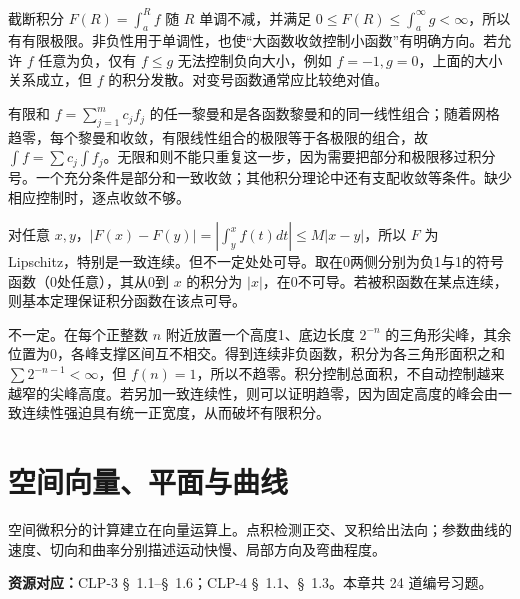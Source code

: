 \documentclass[12pt,fontset=fandol]{ctexart}
\begin{document}
\begin{solve}\label{ans:c30q17}
截断积分 $F(R)=\int_a^Rf$ 随 $R$ 单调不减，并满足 $0\le F(R)\le\int_a^\infty g<\infty$，所以有有限极限。非负性用于单调性，也使“大函数收敛控制小函数”有明确方向。若允许 $f$ 任意为负，仅有 $f\le g$ 无法控制负向大小，例如 $f=-1,g=0$，上面的大小关系成立，但 $f$ 的积分发散。对变号函数通常应比较绝对值。
\end{solve}

\begin{solve}\label{ans:c30q18}
有限和 $f=\sum_{j=1}^mc_jf_j$ 的任一黎曼和是各函数黎曼和的同一线性组合；随着网格趋零，每个黎曼和收敛，有限线性组合的极限等于各极限的组合，故 $\int f=\sum c_j\int f_j$。无限和则不能只重复这一步，因为需要把部分和极限移过积分号。一个充分条件是部分和一致收敛；其他积分理论中还有支配收敛等条件。缺少相应控制时，逐点收敛不够。
\end{solve}

\begin{solve}\label{ans:c30q19}
对任意 $x,y$，$|F(x)-F(y)|=|\int_y^xf(t)dt|\le M|x-y|$，所以 $F$ 为 Lipschitz，特别是一致连续。但不一定处处可导。取在0两侧分别为负1与1的符号函数（0处任意），其从0到 $x$ 的积分为 $|x|$，在0不可导。若被积函数在某点连续，则基本定理保证积分函数在该点可导。
\end{solve}

\begin{solve}\label{ans:c30q20}
不一定。在每个正整数 $n$ 附近放置一个高度1、底边长度 $2^{-n}$ 的三角形尖峰，其余位置为0，各峰支撑区间互不相交。得到连续非负函数，积分为各三角形面积之和 $\sum2^{-n-1}<\infty$，但 $f(n)=1$，所以不趋零。积分控制总面积，不自动控制越来越窄的尖峰高度。若另加一致连续性，则可以证明趋零，因为固定高度的峰会由一致连续性强迫具有统一正宽度，从而破坏有限积分。
\end{solve}

\clearpage
\section{空间向量、平面与曲线}\label{sec:ch31}
空间微积分的计算建立在向量运算上。点积检测正交、叉积给出法向；参数曲线的速度、切向和曲率分别描述运动快慢、局部方向及弯曲程度。

\textbf{资源对应：}CLP-3 \S~1.1--\S~1.6；CLP-4 \S~1.1、\S~1.3。本章共 24 道编号习题。
\end{document}
